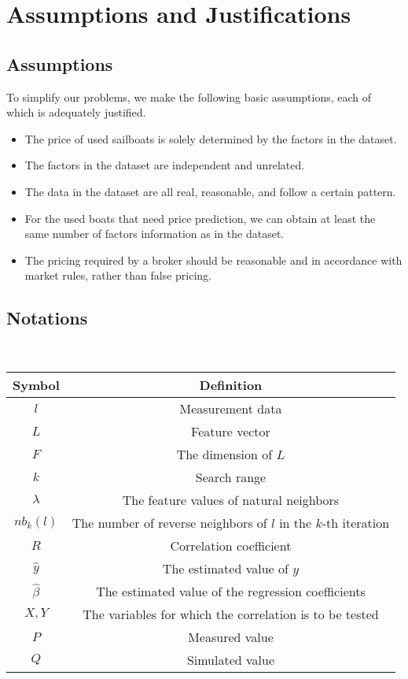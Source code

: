 \documentclass[12pt]{article}  %
\begin{document}
\section{Assumptions and Justifications}
\subsection{Assumptions}
To simplify our problems, we make the following basic assumptions, each of which is
adequately justified.
\begin{itemize}
    \item The price of used sailboats is solely determined by the factors in the dataset.
    \item The factors in the dataset are independent and unrelated.
    \item The data in the dataset are all real, reasonable, and follow a certain pattern.
    \item For the used boats that need price prediction, we can obtain at least the same number of factors information as in the dataset.
    \item The pricing required by a broker should be reasonable and in accordance with market rules, rather than false pricing.
\end{itemize}
\subsection{Notations}
\ 
\begin{table}[!htbp]
\begin{center}
\begin{tabular}{cc}
	\toprule

	Symbol& Definition\\
	\midrule
	$l$ &Measurement data\\
    \hline
	$L$ &Feature vector\\
    \hline
	$F$ &The dimension of $L$\\
    \hline
    $k$ &Search range\\
    \hline
    $\lambda$ & The feature values of natural neighbors\\
    \hline
    $nb_k(l)$ & The number of reverse neighbors of $l$ in the $k$-th iteration\\
    \hline
    $R$ & Correlation coefficient\\
    \hline
    $\hat{y}$ & The estimated value of $y$\\
    \hline
    $\hat{\beta}$ & The estimated value of the regression coefficients\\
    \hline
    $X, Y$ & The variables for which the correlation is to be tested \\
    \hline
    $P$ & Measured value \\
    \hline
    $Q$ & Simulated value \\ 
	\bottomrule
\end{tabular}
\end{center}
\end{table}
\end{document}
